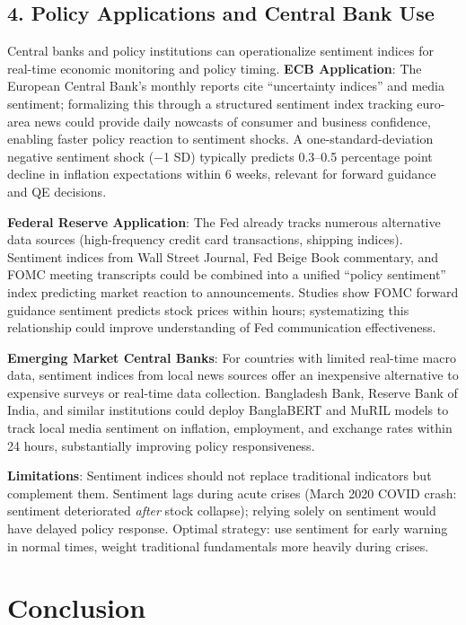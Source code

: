 \documentclass[11pt]{article}
\begin{document}
\subsection{4. Policy Applications and Central Bank Use}

Central banks and policy institutions can operationalize sentiment indices for real-time economic monitoring and policy timing. \textbf{ECB Application}: The European Central Bank's monthly reports cite ``uncertainty indices'' and media sentiment; formalizing this through a structured sentiment index tracking euro-area news could provide daily nowcasts of consumer and business confidence, enabling faster policy reaction to sentiment shocks. A one-standard-deviation negative sentiment shock ($-$1 SD) typically predicts 0.3--0.5 percentage point decline in inflation expectations within 6 weeks, relevant for forward guidance and QE decisions.

\textbf{Federal Reserve Application}: The Fed already tracks numerous alternative data sources (high-frequency credit card transactions, shipping indices). Sentiment indices from Wall Street Journal, Fed Beige Book commentary, and FOMC meeting transcripts could be combined into a unified ``policy sentiment'' index predicting market reaction to announcements. Studies show FOMC forward guidance sentiment predicts stock prices within hours; systematizing this relationship could improve understanding of Fed communication effectiveness.

\textbf{Emerging Market Central Banks}: For countries with limited real-time macro data, sentiment indices from local news sources offer an inexpensive alternative to expensive surveys or real-time data collection. Bangladesh Bank, Reserve Bank of India, and similar institutions could deploy BanglaBERT and MuRIL models to track local media sentiment on inflation, employment, and exchange rates within 24 hours, substantially improving policy responsiveness.

\textbf{Limitations}: Sentiment indices should not replace traditional indicators but complement them. Sentiment lags during acute crises (March 2020 COVID crash: sentiment deteriorated \emph{after} stock collapse); relying solely on sentiment would have delayed policy response. Optimal strategy: use sentiment for early warning in normal times, weight traditional fundamentals more heavily during crises.

\section{Conclusion}
\end{document}
